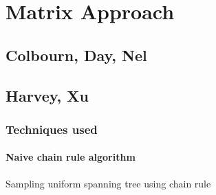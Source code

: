 
\chapter{Matrix Approach} %

\label{Chapter4} %

\section{Colbourn, Day, Nel}

\section{Harvey, Xu}

\subsection{Techniques used}



\subsubsection{Naive chain rule algorithm}


\newcommand{\laplacian}[1][G]{\ensuremath{L_{#1}^{+}}}
\newcommand{\reffformula}[1][\laplacian]{\ensuremath{ (\chi_u - \chi_v)^T \  #1 \ (\chi_u - \chi_v) }}
\newcommand{\reff}[1][e]{\ensuremath{R_#1^{\text{eff}}}}
\newcommand{\proj}{\ensuremath{I - \frac{\textbf{1} \textbf{1}^T}{n}}}

\newcommand{\Mset}[2]{\ensuremath{\mathbb{M}_{#1 \times #2}}}


\newcommand{\Lim}[1]{\raisebox{0.5ex}{\scalebox{0.8}{$\displaystyle \lim_{#1}\;$}}}


\begin{algorithm}[H]
 
 \caption{Sampling uniform spanning tree using chain rule}
\end{algorithm}

